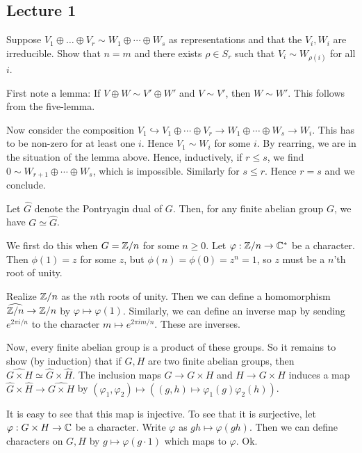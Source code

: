 \documentclass[11pt, english]{article}
\begin{document}
\subsection{Lecture 1}
\begin{exc}
Suppose $V_1 \oplus \ldots \oplus V_r \sim W_1 \oplus \cdots \oplus W_s$ as representations and that the $V_i,W_i$ are irreducible. Show that $n=m$ and there exists $\rho \in S_r$ such that $V_i \sim W_{\rho(i)}$ for all $i$.
\end{exc}
\begin{sol}
First note a lemma: If $V \oplus W \sim V' \oplus W'$ and $V \sim V'$, then $W \sim W'$. This follows from the five-lemma.

Now consider the composition $V_1 \hookrightarrow V_1 \oplus \cdots \oplus V_r  \to W_1 \oplus \cdots \oplus W_s \to W_i$. This has to be non-zero for at least one $i$. Hence $V_1 \sim W_i$ for some $i$. By rearring, we are in the situation of the lemma above. Hence, inductively, if $r \leq s$, we find $0 \sim W_{r+1} \oplus \cdots \oplus W_s$, which is impossible. Similarly for $s \leq r$. Hence $r=s$ and we conclude.
\end{sol}

\begin{exc}
 Let $\hat G$ denote the Pontryagin dual of $G$. Then, for any finite abelian group $G$, we have $G \simeq \hat G$.
\end{exc}
\begin{sol}
We first do this when $G= \mathbb{Z}/n$ for some $n \geq 0$. Let $\varphi:\mathbb{Z}/n \to \mathbb{C}^\ast$ be a character. Then $\phi(1)=z$ for some $z$, but $\phi(n)=\phi(0)=z^n=1$, so $z$ must be a $n$'th root of unity.

Realize $\mathbb{Z}/n$ as the $n$th roots of unity. Then we can define a homomorphism $\widehat {\mathbb{Z}/n} \to \mathbb{Z}/n$ by $\varphi \mapsto \varphi(1)$. Similarly, we can define an inverse map by sending $e^{2\pi i/n}$  to the character $m \mapsto e^{2\pi i m /n}$. These are inverses.

Now, every finite abelian group is a product of these groups. So it remains to show (by induction) that if $G,H$ are two finite abelian groups, then $\widehat {G \times H} \simeq \widehat G \times \widehat H$. The inclusion maps $G \to G \times H$ and $H \to G \times H$ induces a map $\widehat G \times \widehat H \to \widehat{G \times H}$ by $(\varphi_1, \varphi_2) \mapsto ((g,h) \mapsto \varphi_1(g)\varphi_2(h))$.

It is easy to see that this map is injective. To see that it is surjective, let $\varphi:G \times H \to \mathbb{C}$ be a character. Write $\varphi$ as $gh \mapsto \varphi(gh)$. Then we can define characters on $G,H$ by $g \mapsto \varphi(g \cdot 1)$ which maps to $\varphi$. Ok.
\end{sol}
\end{document}
